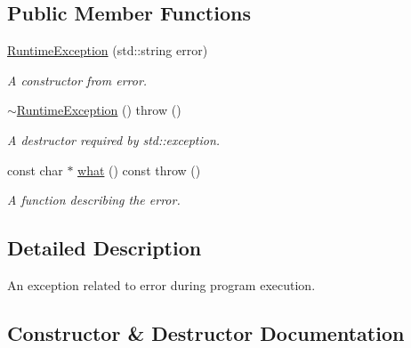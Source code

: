 \subsection*{Public Member Functions}
\begin{DoxyCompactItemize}
\item 
\hyperlink{class_r_c_f_1_1_common_1_1_runtime_exception_a71a5d289813b628b06d996331fe43896}{Runtime\+Exception} (std\+::string error)
\begin{DoxyCompactList}\small\item\em A constructor from error. \end{DoxyCompactList}\item 
\hypertarget{class_r_c_f_1_1_common_1_1_runtime_exception_aedbe6d21c73d6a74b42deccf5f189de9}{}\hyperlink{class_r_c_f_1_1_common_1_1_runtime_exception_aedbe6d21c73d6a74b42deccf5f189de9}{$\sim$\+Runtime\+Exception} ()  throw ()\label{class_r_c_f_1_1_common_1_1_runtime_exception_aedbe6d21c73d6a74b42deccf5f189de9}

\begin{DoxyCompactList}\small\item\em A destructor required by std\+::exception. \end{DoxyCompactList}\item 
const char $\ast$ \hyperlink{class_r_c_f_1_1_common_1_1_runtime_exception_a49c8baaf5354898bf9780de191a6275c}{what} () const   throw ()
\begin{DoxyCompactList}\small\item\em A function describing the error. \end{DoxyCompactList}\end{DoxyCompactItemize}


\subsection{Detailed Description}
An exception related to error during program execution. 

\subsection{Constructor \& Destructor Documentation}
\hypertarget{class_r_c_f_1_1_common_1_1_runtime_exception_a71a5d289813b628b06d996331fe43896}{}
